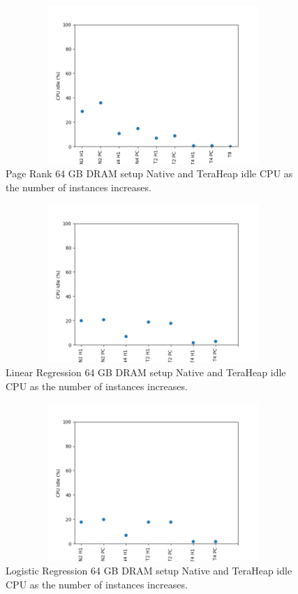 \documentclass[twocolumn,10pt]{asme2e}
\begin{document}
\begin{figure}[h!]
        \includegraphics[width=13cm,height=6cm]{PR_64_IDLE.png}
	\caption{Page Rank 64 GB DRAM setup Native and TeraHeap idle CPU as the number of instances increases.}
	\label{fig:pr_64_idle}
\end{figure}

\begin{figure}[h!]
        \includegraphics[width=13cm,height=6cm]{LINR_64.png}
	\caption{Linear Regression 64 GB DRAM setup Native and TeraHeap idle CPU as the number of instances increases.}
	\label{fig:linr_64_idle}
\end{figure}

\begin{figure}[h!]
        \includegraphics[width=13cm,height=6cm]{LOGR_64.png}
	\caption{Logistic Regression 64 GB DRAM setup Native and TeraHeap idle CPU as the number of instances increases.}
	\label{fig:logr_64_idle}
\end{figure}
\end{document}

